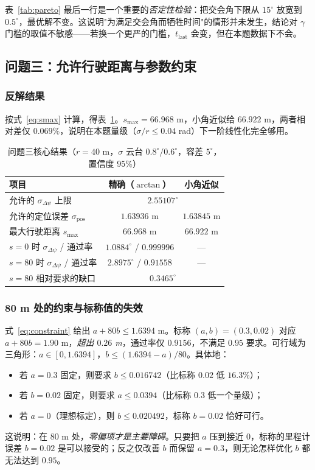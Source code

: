\documentclass[UTF8,a4paper,zihao=-4,oneside]{ctexart}
\begin{document}
表~\ref{tab:pareto} 最后一行是一个重要的\emph{否定性检验}：把交会角下限从 $15^\circ$ 放宽到 $0.5^\circ$，最优解不变。这说明"为满足交会角而牺牲时间"的情形并未发生，结论对 $\gamma$ 门槛的取值不敏感——若换一个更严的门槛，$t_{\mathrm{last}}$ 会变，但在本题数据下不会。

\subsection{问题三：允许行驶距离与参数约束}

\subsubsection{反解结果}

按式~\eqref{eq:smax} 计算，得表~\ref{tab:q3}。$s_{\max}=66.968$ m，小角近似给 $66.922$ m，两者相对差仅 $0.069\%$，说明在本题量级（$\sigma/r\le0.04$ rad）下一阶线性化完全够用。

\begin{table}[htbp]
  \centering
  \caption{问题三核心结果（$r=40$ m，$\sigma$ 云台 $0.8^\circ/0.6^\circ$，容差 $5^\circ$，置信度 $95\%$）}
  \label{tab:q3}
  \small
  \begin{tabular}{lcc}
    \toprule
    项目 & 精确（$\arctan$） & 小角近似 \\
    \midrule
    允许的 $\sigma_{\Delta\psi}$ 上限 & \multicolumn{2}{c}{$2.55107^\circ$} \\
    允许的定位误差 $\sigma_{\mathrm{pos}}$ & $1.63936$ m & $1.63845$ m \\
    最大行驶距离 $s_{\max}$ & $\bm{66.968}$ m & $66.922$ m \\
    \midrule
    $s=0$ 时 $\sigma_{\Delta\psi}$ / 通过率 & $1.0884^\circ$ / $0.999996$ & — \\
    $s=80$ 时 $\sigma_{\Delta\psi}$ / 通过率 & $2.8975^\circ$ / $0.91558$ & — \\
    $s=80$ 相对要求的缺口 & \multicolumn{2}{c}{$0.3465^\circ$} \\
    \bottomrule
  \end{tabular}
\end{table}

\subsubsection{80 m 处的约束与标称值的失效}

式~\eqref{eq:constraint} 给出 $a+80b\le1.6394$ m。标称 $(a,b)=(0.3,0.02)$ 对应 $a+80b=1.90$ m，\emph{超出 $0.26$ m}，通过率仅 $0.9156$，不满足 $0.95$ 要求。可行域为三角形：$a\in[0,1.6394]$，$b\le(1.6394-a)/80$。具体地：
\begin{itemize}[leftmargin=2em]
  \item 若 $a=0.3$ 固定，则要求 $b\le0.016742$（比标称 $0.02$ 低 $16.3\%$）；
  \item 若 $b=0.02$ 固定，则要求 $a\le0.0394$（比标称 $0.3$ 低一个量级）；
  \item 若 $a=0$（理想标定），则 $b\le0.020492$，标称 $b=0.02$ 恰好可行。
\end{itemize}
这说明：在 $80$ m 处，\emph{零偏项才是主要障碍}。只要把 $a$ 压到接近 $0$，标称的里程计误差 $b=0.02$ 是可以接受的；反之仅改善 $b$ 而保留 $a=0.3$，则无论怎样优化 $b$ 都无法达到 $0.95$。
\end{document}
